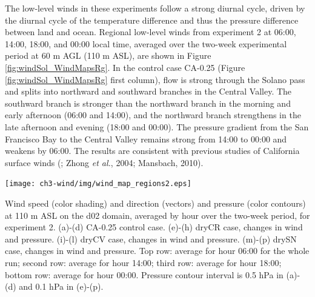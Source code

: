 The low-level winds in these experiments follow a strong diurnal cycle, driven by the diurnal cycle of the temperature difference and thus the pressure difference between land and ocean.  Regional low-level winds from experiment 2 at 06:00, 14:00, 18:00, and 00:00 local time, averaged over the two-week experimental period at 60 m AGL (110 m ASL), are shown in Figure \ref{fig:windSol_WindMapsRg}.  In the control case CA-0.25 (Figure \ref{fig:windSol_WindMapsRg} first column), flow is strong through the Solano pass and splits into northward and southward branches in the Central Valley.  The southward branch is stronger than the northward branch in the morning and early afternoon (06:00 and 14:00), and the northward branch strengthens in the late afternoon and evening (18:00 and 00:00).  The pressure gradient from the San Francisco Bay to the Central Valley remains strong from 14:00 to 00:00 and weakens by 06:00.  The results are consistent with previous studies of California surface winds (\cite{zhong2004diurnal}; Zhong \textit{et al.}, 2004; Mansbach, 2010).

\begin{FPfigure}
\texttt{[image: ch3-wind/img/wind\_map\_regions2.eps]}
\caption{Wind speed (color shading) and direction (vectors) and pressure (color contours) at 110 m ASL on the d02 domain, averaged by hour over the two-week period, for experiment 2.  (a)-(d) CA-0.25 control case.  (e)-(h) dryCR case, changes in wind and pressure.  (i)-(l) dryCV case, changes in wind and pressure.  (m)-(p) drySN case, changes in wind and pressure.  Top row: average for hour 06:00 for the whole run; second row: average for hour 14:00; third row: average for hour 18:00; bottom row: average for hour 00:00.  Pressure contour interval is 0.5 hPa in (a)-(d) and 0.1 hPa in (e)-(p).}
\label{fig:windSol_WindMapsRg}
\end{FPfigure}


